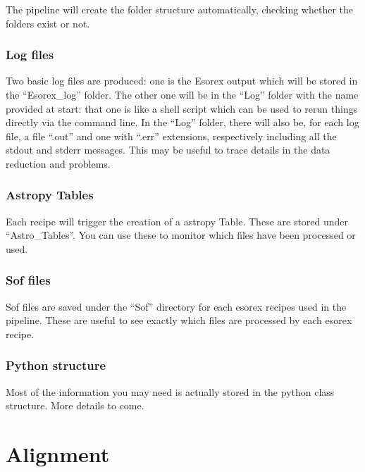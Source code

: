 \documentclass[letterpaper,10pt,english]{sphinxmanual}
\begin{document}
\sphinxAtStartPar
The pipeline will create the folder structure automatically, checking whether the folders exist or not.


\subsubsection{Log files}
\label{\detokenize{getting_started:log-files}}
\sphinxAtStartPar
Two basic log files are produced: one is the Esorex output which will be stored in the
“Esorex\_log” folder. The other one will be in the “Log” folder with the name provided at start:
that one is like a shell script which can be used to rerun things directly via the command line.
In the “Log” folder, there will also be, for each log file, a file “.out” and one with “.err”
extensions, respectively including all the stdout and stderr messages. This may be useful to trace
details in the data reduction and problems.


\subsubsection{Astropy Tables}
\label{\detokenize{getting_started:astropy-tables}}
\sphinxAtStartPar
Each recipe will trigger the creation of a astropy Table.
These are stored under “Astro\_Tables”. You can use these to monitor which files have been
processed or used.


\subsubsection{Sof files}
\label{\detokenize{getting_started:sof-files}}
\sphinxAtStartPar
Sof files are saved under the “Sof” directory for each esorex recipes used in the pipeline.
These are useful to see exactly which files are processed by each esorex recipe.


\subsubsection{Python structure}
\label{\detokenize{getting_started:python-structure}}
\sphinxAtStartPar
Most of the information you may need is actually stored in the python
{\hyperref[\detokenize{api/pymusepipe:pymusepipe.musepipe.MusePipe}]{}} class structure. More details to come.

\sphinxstepscope


\section{Alignment}
\label{\detokenize{alignment:alignment}}\label{\detokenize{alignment::doc}}
\end{document}

